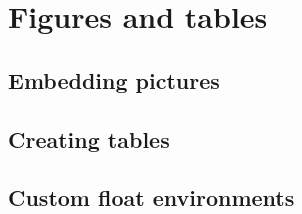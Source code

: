 \chapter{Figures and tables}

\section{Embedding pictures}

\section{Creating tables}


\section{Custom float environments}\label{sec:custom floats}

